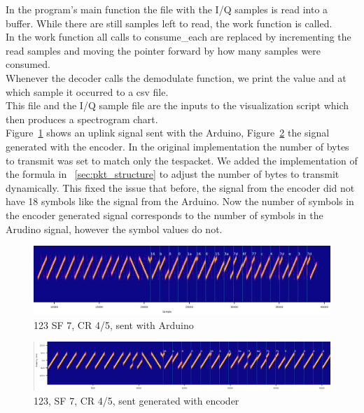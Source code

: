 In the program's main function the file with the I/Q samples is read into a buffer.
While there are still samples left to read, the work function is called.
\\
In the work function all calls to consume\_each are replaced by incrementing the read samples and
moving the pointer forward by how many samples were consumed.\\
Whenever the decoder calls the demodulate function, we print the value and at which sample it occurred to a csv file.\\
This file and the I/Q sample file are the inputs to the visualization script which then produces a spectrogram chart. \\
Figure~\ref{fig:123_ard} shows an uplink signal sent with the Arduino, Figure~\ref{fig:123_enc} the signal generated with the encoder.
In the original implementation the number of bytes to transmit was set to match only the tespacket. We added the implementation of the formula in
~\ref{sec:pkt_structure} to adjust the number of bytes to transmit dynamically.
This fixed the issue that before, the signal from the encoder did not have 18 symbols like the signal from the Arduino.
Now the number of symbols in the encoder generated signal corresponds to the number of symbols in the Arudino signal, however 
the symbol values do not.


\begin{figure}[h]
    \centering
    \includegraphics[width=1\textwidth]{figures/123_SF7_CR4_5_arduino.png}
    \caption{123 SF 7, CR 4/5, sent with Arduino}
    \label{fig:123_ard}
\end{figure}

\begin{figure}[h]
    \centering
    \includegraphics[width=1\textwidth]{figures/123_SF7_CR4_5_from_encode_18_symbols.png}
    \caption{123, SF 7, CR 4/5, sent generated with encoder}
    \label{fig:123_enc}
\end{figure}










